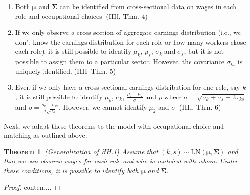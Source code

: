 \documentclass{article}
\newtheorem{theorem}{Theorem}
\begin{document}
\begin{enumerate}
	\item[HH.1] Both $\bm{\mu}$ and $\bm{\Sigma}$ can be identified from cross-sectional data on wages in each role and occupational choices. (HH, Thm. 4)
	\item[HH.2]  If we only observe a cross-section of aggregate earnings distribution (i.e., we don't know the earnings distribution for each role or how many workers chose each role), it is still possible to identify $\mu_k$, $\mu_s$, $\sigma_k$ and $\sigma_s$, but it is not possible to assign them to a particular sector. However, the covariance $\sigma_{ks}$ is uniquely identified. (HH, Thm. 5)
	\item[HH.3]  Even if we only have a cross-sectional earnings distribution for one role, say $k$, it is still possible to identify $\mu_k$, $\sigma_k$, $\frac{\mu_k - \mu_s}{\sigma}$ and $\rho$ where $\sigma = \sqrt{\sigma_k + \sigma_s -2 \sigma_{ks}}$ and $\rho = \frac{\sigma_k - \sigma_{ks}}{\sigma\sqrt{\sigma_k}}$. However, we cannot identify $\mu_2$ and $\sigma$. (HH, Thm. 6)
\end{enumerate}

Next, we adapt these theorems to the model with occupational choice and matching as outlined above. 

\begin{theorem} (Generalization of HH.1)
	Assume that $(k,s) \sim \text{LN}(\bm{\mu},\bm{\Sigma})$ and that we can observe wages for each role and who is matched with whom. Under these conditions, it is possible to identify both $\bm{\mu}$ and $\bm{\Sigma}$.
\end{theorem}

\begin{proof}
	content...
\end{proof}







	
\end{document}
